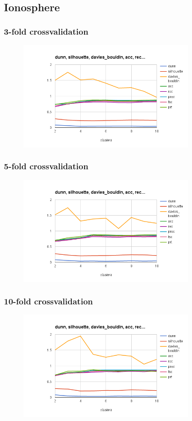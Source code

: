 \documentclass{article}
\begin{document}
\subsection{Ionosphere}
\subsubsection{3-fold crossvalidation}
\begin{figure}[p]
    \centering
    \includegraphics[width=0.8\textwidth]{pam_ionosphere.arff_3}
\end{figure}
\subsubsection{5-fold crossvalidation}
\begin{figure}[p]
    \centering
    \includegraphics[width=0.8\textwidth]{pam_ionosphere.arff_5}
\end{figure}
\subsubsection{10-fold crossvalidation}
\begin{figure}[p]
    \centering
    \includegraphics[width=0.8\textwidth]{pam_ionosphere.arff_10}
\end{figure}
\end{document}

